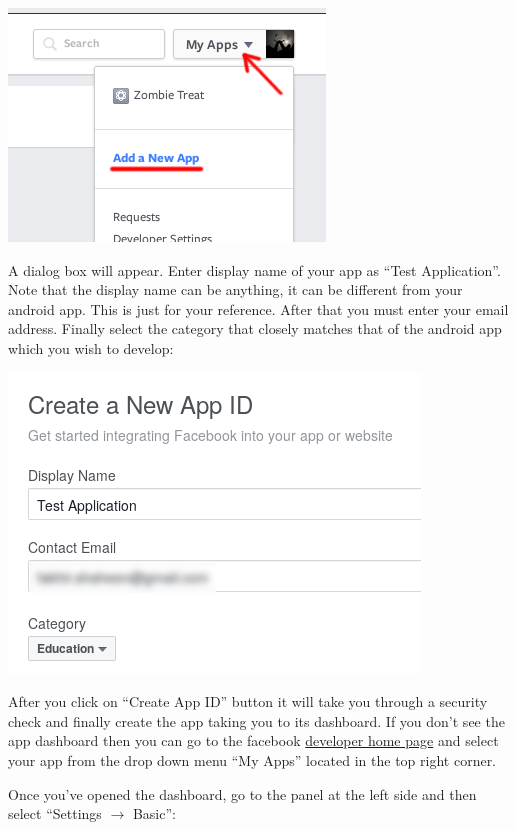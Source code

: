 \begin{center}
	\includegraphics[scale=\SourceCodeScale]{chapters/ch12/images/2}
\end{center}

A dialog box will appear. Enter display name of your app as ``Test Application''. Note that the display name can be anything, it can be different from your android app. This is just for your reference. After that you must enter your email
address. Finally select the category that closely matches that of the android app which you wish to develop:

\begin{center}
	\includegraphics[scale=\SourceCodeScale]{chapters/ch12/images/3}
\end{center}

After you click on ``Create App ID'' button it will take you through a security check and finally create the app taking you to its dashboard. If you don't see the app dashboard then you can go to the facebook \href{https://developers.facebook.com/}{developer home page} and select your app from the drop down menu ``My Apps'' located in the top right corner.

Once you've opened the dashboard, go to the panel at the left side and then select ``Settings $\rightarrow$ Basic'':

